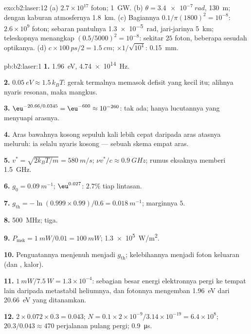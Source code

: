 \begin{solution}{exo:b2:laser:12}
(a) $2.7 \times 10^{17}$ foton; \qty{1}{GW}. (b) $\theta = \qty{3.4e-7}{rad}$,
\qty{130}{m}; dengan kaburan atmosfernya \qty{1.8}{km}. (c) Bagiannya $0.1/\pi(1800)^2 =
10^{-8}$: $2.6 \times 10^9$ foton; sebaran pantulnya \qty{1.3e-5}{rad}, jari-jarinya
\qty{5}{km}; teleskopnya menangkap $(0.5/5000)^2 = 10^{-8}$: sekitar $25$
foton, beberapa sesudah optikanya. (d) $c \times \qty{100}{ps}/2 = \qty{1.5}{cm}$;
$\times 1/\sqrt{10^4}$: \qty{0.15}{mm}.
\end{solution}

\begin{solution}{pb:b2:laser:1}
\textbf{1.} \qty{1.96}{eV}, \qty{4.74e14}{Hz}.

\textbf{2.} $\qty{0.05}{eV} \approx 1.5\,k_BT$: gerak termalnya memasok
defisit yang kecil itu; alihnya nyaris resonan, maka mangkus.

\textbf{3.} $\eu^{-20.66/0.0345} = \eu^{-600} \approx 10^{-260}$: tak ada; hanya
lucutannya yang menyuapi arasnya.

\textbf{4.} Aras bawahnya kosong sepuluh kali lebih cepat daripada aras atasnya
meluruh: ia selalu nyaris kosong --- sebuah skema empat aras.

\textbf{5.} $v^* = \sqrt{2k_BT/m} = \qty{580}{m/s}$; $\nu v^*/c \approx \qty{0.9}{GHz}$;
rumus eksaknya memberi \qty{1.5}{GHz}.

\textbf{6.} $g_0 = \qty{0.09}{m^{-1}}$; $\eu^{0.027}$: $2.7\%$ tiap lintasan.

\textbf{7.} $g_{\text{th}} = -\ln(0.999 \times 0.99)/0.6 = \qty{0.018}{m^{-1}}$;
marginnya $5$.

\textbf{8.} \qty{500}{MHz}; tiga.

\textbf{9.} $P_{\text{msk}} = \qty{1}{mW}/0.01 = \qty{100}{mW}$; \qty{1.3e5}{W/m^2}.

\textbf{10.} Penguatannya menjenuh menjadi $g_{\text{th}}$; kelebihannya menjadi
foton keluaran (dan , kalor).

\textbf{11.} $\qty{1}{mW}/\qty{7.5}{W} = 1.3 \times 10^{-4}$: sebagian besar
energi elektronnya pergi ke tempat lain daripada metastabil heliumnya, dan
fotonnya mengemban \qty{1.96}{eV} dari \qty{20.66}{eV} yang ditanamkan.

\textbf{12.} $2 \times 0.072 \times 0.3 = 0.043$; $N = 0.1 \times 2 \times 10^{-9}/3.14
\times 10^{-19} = 6.4 \times 10^8$; $20.3/0.043 \approx 470$ perjalanan pulang pergi;
\qty{0.9}{\micro s}.


\end{solution}
